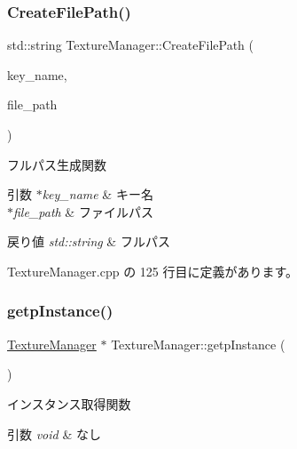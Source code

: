 \subsubsection{\texorpdfstring{Create\+File\+Path()}{CreateFilePath()}}
{\footnotesize\ttfamily std\+::string Texture\+Manager\+::\+Create\+File\+Path (\begin{DoxyParamCaption}\item[{const std\+::string $\ast$}]{key\+\_\+name,  }\item[{const std\+::string $\ast$}]{file\+\_\+path }\end{DoxyParamCaption})\hspace{0.3cm}{\ttfamily [private]}}



フルパス生成関数 


\begin{DoxyParams}{引数}
{\em $\ast$key\+\_\+name} & キー名 \\
\hline
{\em $\ast$file\+\_\+path} & ファイルパス \\
\hline
\end{DoxyParams}

\begin{DoxyRetVals}{戻り値}
{\em std\+::string} & フルパス \\
\hline
\end{DoxyRetVals}


 Texture\+Manager.\+cpp の 125 行目に定義があります。

\mbox{\label{class_texture_manager_a476998e9556141f2b5443ee34797c41d}} 
\subsubsection{\texorpdfstring{getp\+Instance()}{getpInstance()}}
{\footnotesize\ttfamily \mbox{\hyperlink{class_texture_manager}{Texture\+Manager}} $\ast$ Texture\+Manager\+::getp\+Instance (\begin{DoxyParamCaption}{ }\end{DoxyParamCaption})\hspace{0.3cm}{\ttfamily [static]}}



インスタンス取得関数 


\begin{DoxyParams}{引数}
{\em void} & なし \\
\hline
\end{DoxyParams}

